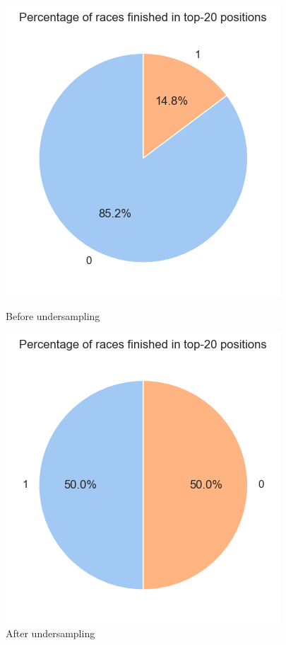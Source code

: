 \documentclass{article}
\begin{document}
\begin{figure}[H]
    \centering
    \begin{minipage}{0.45\linewidth}
        \centering
        \includegraphics[width=\linewidth]{beforeunders.png}
        \caption{Before undersampling}
        \label{fig:beforeunders}
    \end{minipage}
    \hfill
    \begin{minipage}{0.45\linewidth}
        \centering
        \includegraphics[width=\linewidth]{afterunders.png}
        \caption{After undersampling}
        \label{fig:afterunders}
    \end{minipage}
\end{figure}
\end{document}
